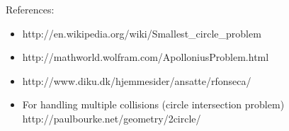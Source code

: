 \documentclass[a4paper]{article}
\begin{document}
References:
\begin{itemize}
\itemsep0em
	\item http://en.wikipedia.org/wiki/Smallest\_circle\_problem
	\item http://mathworld.wolfram.com/ApolloniusProblem.html
	\item http://www.diku.dk/hjemmesider/ansatte/rfonseca/
	\item For handling multiple collisions (circle intersection problem) http://paulbourke.net/geometry/2circle/
\end{itemize}
\end{document}
